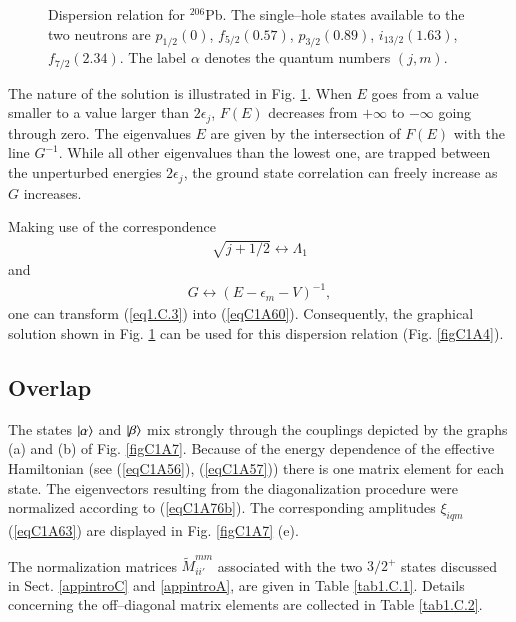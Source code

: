 \begin{subappendices}
\begin{figure}
{}
\caption{Dispersion relation for $^{206}$Pb. The single--hole states available to the two neutrons are $p_{1/2}(0)$, $f_{5/2}(0.57)$, $p_{3/2}(0.89)$, $i_{13/2}(1.63)$, $f_{7/2}(2.34)$. The label $\alpha$ denotes the quantum numbers $(j,m)$.}
\label{fig1.C.1}
\end{figure}
The nature of the solution is illustrated in Fig. \ref{fig1.C.1}. When $E$ goes from a value smaller to a value larger than $2\epsilon_j$, $F(E)$ decreases from $+\infty$ to $-\infty$ going through zero. The eigenvalues $E$ are given by the intersection of $F(E)$ with the line $G^{-1}$. While all other eigenvalues than the lowest one, are trapped between the unperturbed energies $2\epsilon_j$, the ground state correlation can freely increase as $G$ increases.


Making use of the correspondence
\begin{align}\label{eq1.C.4}
\sqrt{j+1/2}\leftrightarrow\Lambda_1
\end{align}
and
\begin{align}\label{eq1.C.5}
G\leftrightarrow(E-\epsilon_m-V)^{-1},
\end{align}
one can transform (\ref{eq1.C.3}) into (\ref{eqC1A60}). Consequently, the graphical solution shown in Fig. \ref{fig1.C.1} can be used for this dispersion relation (Fig. \ref{figC1A4}).
 \subsection{Overlap}\label{AppCS2}
 The states $|{\alpha} \rangle$ and $|{\beta} \rangle$ mix strongly through the couplings depicted by the graphs (a) and (b) of Fig. \ref{figC1A7}. Because of the energy dependence of the effective Hamiltonian (see (\ref{eqC1A56}), (\ref{eqC1A57})) there is one matrix element for each state. The eigenvectors resulting from the diagonalization procedure were normalized according to (\ref{eqC1A76b}). The corresponding amplitudes $\xi_{iqm}$ (\ref{eqC1A63}) are displayed in Fig. \ref{figC1A7} (e).
 
 
 The normalization matrices $\tilde M_{ii'}^{mm}$ associated with the two $3/2^+$ states discussed in Sect. \ref{appintroC} and \ref{appintroA}, are given in Table \ref{tab1.C.1}. Details concerning the off--diagonal matrix elements are collected in Table \ref{tab1.C.2}.
 

\end{subappendices}

